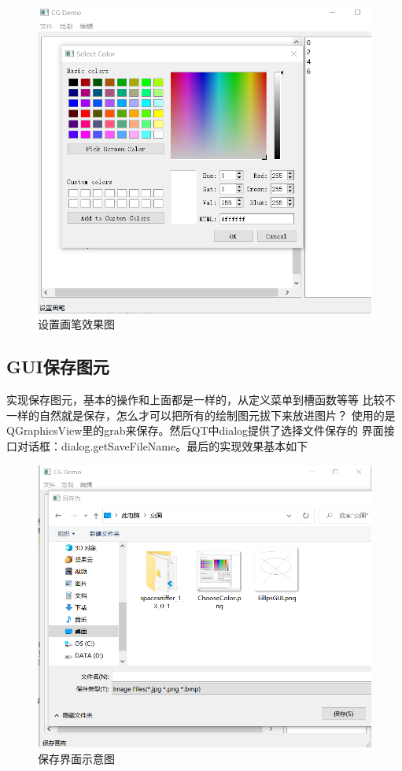 \documentclass[a4paper,UTF8]{article}
\theoremstyle{definition}
\begin{document}
\begin{figure}[h]
	\centering
	\includegraphics[scale=0.3]{figure/ChooseColor.png}
	\caption{设置画笔效果图}
	\label{fig:EillpsGUI}
\end{figure}


\subsection{GUI保存图元}
实现保存图元，基本的操作和上面都是一样的，从定义菜单到槽函数等等
比较不一样的自然就是保存，怎么才可以把所有的绘制图元拔下来放进图片？
使用的是QGraphicsView里的grab来保存。然后QT中dialog提供了选择文件保存的
界面接口对话框：dialog.getSaveFileName。最后的实现效果基本如下

\begin{figure}[h]
	\centering
	\includegraphics[scale=0.5]{figure/SaveCanvas.png}
	\caption{保存界面示意图}
	\label{fig:SaveCanvas}
\end{figure}
\end{document}
